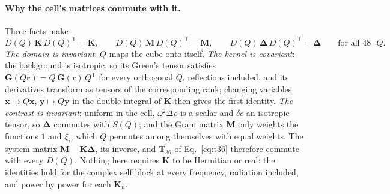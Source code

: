 \documentclass[11pt,a4paper]{article}
\newcommand{\bK}{\mathbf{K}}
\newcommand{\bG}{\mathbf{G}}
\newcommand{\bM}{\mathbf{M}}
\newcommand{\bT}{\mathbf{T}}
\newcommand{\bx}{\mathbf{x}}
\newcommand{\by}{\mathbf{y}}
\newcommand{\bD}{\boldsymbol{\Delta}}
\begin{document}
\paragraph{Why the cell's matrices commute with it.} Three facts make
\begin{equation}\label{eq:commute}
  D(Q)\,\bK\,D(Q)^{\mathsf T}=\bK,\qquad D(Q)\,\bM\,D(Q)^{\mathsf T}=\bM,\qquad D(Q)\,\bD\,D(Q)^{\mathsf T}=\bD
  \qquad\text{for all $48$ }Q.
\end{equation}
\emph{The domain is invariant}: $Q$ maps the cube onto itself. \emph{The kernel is covariant}: the
background is isotropic, so its Green's tensor satisfies $\bG(Q\mathbf r)=Q\,\bG(\mathbf r)\,Q^{\mathsf T}$
for every orthogonal $Q$, reflections included, and its derivatives transform as tensors of the
corresponding rank; changing variables $\bx\mapsto Q\bx$, $\by\mapsto Q\by$ in the double integral of
$\bK$ then gives the first identity. \emph{The contrast is invariant}: uniform in the cell, $\omega^2\Delta\rho$ is a
scalar and $\delta c$ an isotropic tensor, so $\bD$ commutes with $S(Q)$; and the Gram matrix $\bM$ only
weights the functions $1$ and $\xi_i$, which $Q$ permutes among themselves with equal weights. The system
matrix $\bM-\bK\bD$, its inverse, and $\bT_{36}$ of Eq.~\eqref{eq:t36} therefore commute with every
$D(Q)$. Nothing here requires $\bK$ to be Hermitian or real: the identities hold for the complex self block
at every frequency, radiation included, and power by power for each $\bK_n$.
\end{document}
